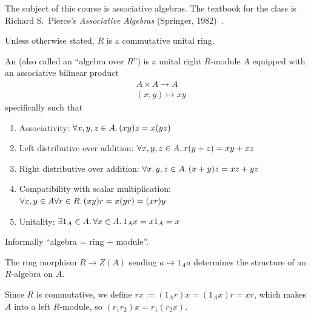 
\lecture{}

\begin{node}
The subject of this course is associative algebras.
The textbook for the class is Richard S.~Pierce's \textit{Associative Algebras}
(Springer, 1982)~\cite{pierce1982associative}.
\end{node}

\begin{node}
Unless otherwise stated, $R$ is a commutative unital ring.
\end{node}

\begin{definition}
An  (also called an ``algebra over $R$'') is a
unital right $R$-module $A$ equipped with an associative bilinear
product
\begin{equation}
\begin{split}
&A\times A\to A\\
&(x,y)\mapsto xy
\end{split}
\end{equation}
specifically such that
\begin{enumerate}
\item Associativity: $\forall x,y,z\in A\ldotp(xy)z=x(yz)$
\item Left distributive over addition: $\forall x,y,z\in A\ldotp x(y+z)=xy+xz$
\item Right distributive over addition: $\forall x,y,z\in A\ldotp (x+y)z=xz+yz$
\item Compatibility with scalar multiplication: $\forall x,y\in A\forall r\in R\ldotp (xy)r=x(yr)=(xr)y$
\item Unitality: $\exists 1_{A}\in A\ldotp\forall x\in A\ldotp 1_{A}x=x1_{A}=x$
\end{enumerate}
Informally ``algebra = ring + module''.
\end{definition}

\begin{note}
The ring morphism $R\to Z(A)$ sending $a\mapsto 1_{A}a$ determines the
structure of an $R$-algebra on $A$.
\end{note}

\begin{note}
Since $R$ is commutative, we define $rx:=(1_{A}r)x=(1_{A}x)r=xr$,
which makes $A$ into a left $R$-module, so $(r_{1}r_{2})x=r_{1}(r_{2}x)$.
\end{note}

